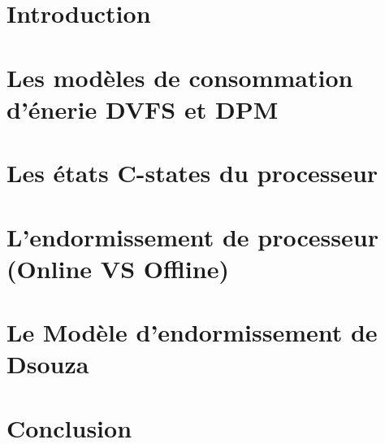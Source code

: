 \section{Introduction}
\section{Les modèles de consommation d'énerie DVFS et DPM}
\section{Les états C-states du processeur}
\section{L'endormissement de processeur (Online VS Offline)}
\section{Le Modèle d'endormissement de Dsouza}
\section{Conclusion}